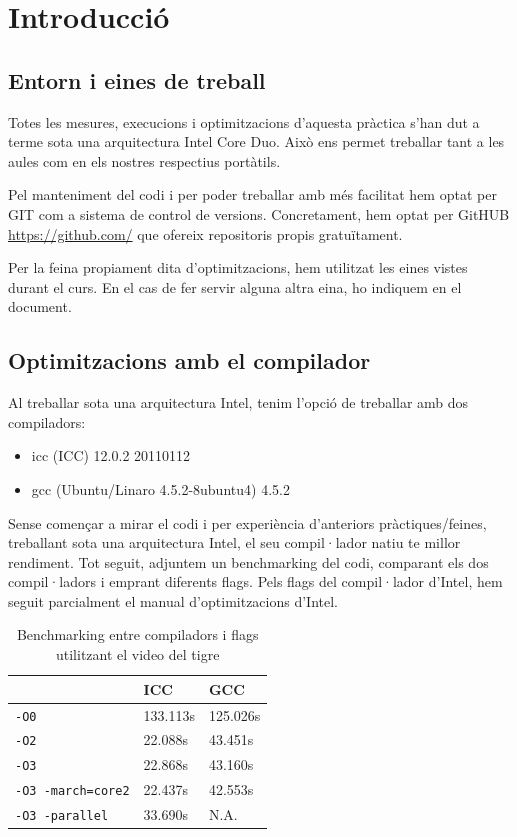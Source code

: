 \chapter{Introducci\'o}

\section{Entorn i eines de treball}
Totes les mesures, execucions i optimitzacions d'aquesta pràctica s'han dut a terme sota una arquitectura Intel Core Duo. Això ens permet treballar tant a les aules com en els nostres respectius portàtils.

Pel manteniment del codi i per poder treballar amb més facilitat hem optat per GIT com a sistema de control de versions. Concretament, hem optat per GitHUB \url{https://github.com/} que ofereix repositoris propis gratuïtament.

Per la feina propiament dita d'optimitzacions, hem utilitzat les eines vistes durant el curs. En el cas de fer servir alguna altra eina, ho indiquem en el document.

\section{Optimitzacions amb el compilador}
Al treballar sota una arquitectura Intel, tenim l'opció de treballar amb dos compiladors:

\begin{itemize}
  \item icc (ICC) 12.0.2 20110112
  \item gcc (Ubuntu/Linaro 4.5.2-8ubuntu4) 4.5.2
\end{itemize}

Sense començar a mirar el codi i per experiència d'anteriors pràctiques/feines, treballant sota una arquitectura Intel, el seu compil·lador natiu te millor rendiment. Tot seguit, adjuntem un benchmarking del codi, comparant els dos compil·ladors i emprant diferents flags. Pels flags del compil·lador d'Intel, hem seguit parcialment el manual d'optimitzacions d'Intel.

\begin{table}
\begin{center}
\begin{tabular}{lll}
\hline
 & ICC & GCC \\
\hline
\texttt{-O0} & 133.113s & 125.026s \\
\texttt{-O2} & 22.088s & 43.451s \\
\texttt{-O3} & 22.868s & 43.160s \\
\texttt{-O3 -march=core2} & 22.437s & 42.553s \\
\texttt{-O3 -parallel} & 33.690s & N.A.\\
\hline
\end{tabular}
\caption{Benchmarking entre compiladors i flags utilitzant el video del tigre}
\end{center}
\label{table1}
\end{table}

